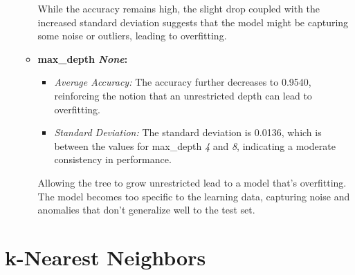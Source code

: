 \documentclass[acmconf,nonacm=true]{acmart}
\begin{document}
\begin{enumerate}
\begin{itemize}
        While the accuracy remains high, the slight drop coupled with the increased standard deviation suggests that the model might be capturing some noise or outliers, leading to overfitting.

        \item \textbf{max\_depth \textit{None}:}
        \begin{itemize}
            \item \textit{Average Accuracy:} The accuracy further decreases to 0.9540, reinforcing the notion that an unrestricted depth can lead to overfitting.
            \item \textit{Standard Deviation:} The standard deviation is 0.0136, which is between the values for max\_depth \textit{4} and \textit{8}, indicating a moderate consistency in performance.
        \end{itemize}

        Allowing the tree to grow unrestricted lead to a model that's overfitting. The model becomes too specific to the learning data, capturing noise and anomalies that don't generalize well to the test set.
    \end{itemize}
\end{enumerate}

\section{k-Nearest Neighbors}
\end{document}
